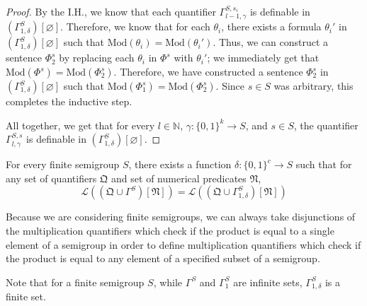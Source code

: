 \documentclass[a4paper,UKenglish,cleveref, autoref, thm-restate, anonymous]{lipics-v2021}
\newcommand{\todo}[1]{\textit{\textcolor{red}{[TODO]: #1}}}
\begin{document}
\begin{proof}
    By the I.H., we know that each quantifier $\Gamma^{S,s_i}_{l-1,\gamma}$ is definable in $(\Gamma^S_{1,\delta})[\varnothing]$. Therefore, we know that for each $\theta_i$, there exists a formula $\theta_i'$ in $(\Gamma^S_{1,\delta})[\varnothing]$ such that $\text{Mod}(\theta_i) = \text{Mod}(\theta_i')$. Thus, we can construct a sentence $\Phi_2^s$ by replacing each $\theta_i$ in $\Phi^s$ with $\theta_i'$; we immediately get that $\text{Mod}(\Phi^s) = \text{Mod}(\Phi_2^s)$. Therefore, we have constructed a sentence $\Phi_2^s$ in $(\Gamma^S_{1,\delta})[\varnothing]$ such that $\text{Mod}(\Phi_1^s) = \text{Mod}(\Phi_2^s)$. Since $s \in S$ was arbitrary, this completes the inductive step.

    All together, we get that for every $l \in \mathbb{N}$, $\gamma : \{0,1\}^k \rightarrow S$, and $s \in S$, the quantifier $\Gamma^{S,s}_{l,\gamma}$ is definable in $(\Gamma^{S}_{1,\delta})[\varnothing]$.


\end{proof}

\begin{corollary}\label{cor:unarymqssuffice}
    For every finite semigroup $S$, there exists a function $\delta : \{0,1\}^c \rightarrow S$ such that for any set of quantifiers $\mathfrak{Q}$ and set of numerical predicates $\mathfrak{N}$,\[
        \mathcal{L}((\mathfrak{Q} \cup \Gamma^{S})[\mathfrak{N}]) = \mathcal{L}((\mathfrak{Q} \cup \Gamma^{S}_{1,\delta})[\mathfrak{N}])
    \]
\end{corollary}
\begin{remark}
    Because we are considering finite semigroups, we can always take disjunctions of the multiplication quantifiers which check if the product is equal to a single element of a semigroup in order to define multiplication quantifiers which check if the product is equal to any element of a specified subset of a semigroup.
\end{remark}
\begin{remark}
    Note that for a finite semigroup $S$, while $\Gamma^{S}$ and $\Gamma^{S}_1$ are infinite sets, $\Gamma^{S}_{1,\delta}$ is a finite set.
\end{remark}
\end{document}
